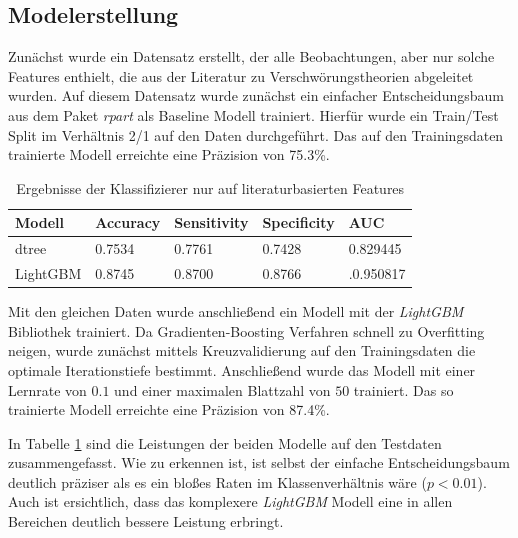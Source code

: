 \subsection{Modelerstellung}

Zunächst wurde ein Datensatz erstellt, der alle Beobachtungen, aber nur solche Features enthielt, die aus der Literatur zu Verschwörungstheorien abgeleitet wurden.
Auf diesem Datensatz wurde zunächst ein einfacher Entscheidungsbaum aus dem Paket \textit{rpart} \parencite[]{rpart} als Baseline Modell trainiert.
Hierfür wurde ein Train/Test Split im Verhältnis 2/1 auf den Daten durchgeführt.
Das auf den Trainingsdaten trainierte Modell erreichte eine Präzision von 75.3\%.


\begin{table}
    \begin{center}
        \begin{tabularx}{\textwidth}{X|XXXX}
            \toprule
            Modell & Accuracy & Sensitivity & Specificity & AUC\\
            \midrule
            dtree & 0.7534 & 0.7761 & 0.7428 & 0.829445 \\
            LightGBM & 0.8745 & 0.8700 & 0.8766 & .0.950817 \\
            \bottomrule
        \end{tabularx}
        \caption{Ergebnisse der Klassifizierer nur auf literaturbasierten Features}
        \label{small-model}
    \end{center}
\end{table}


Mit den gleichen Daten wurde anschließend ein Modell mit der \textit{LightGBM} Bibliothek \parencite[][]{lightgbm} trainiert.
Da Gradienten-Boosting Verfahren schnell zu Overfitting neigen, wurde zunächst mittels Kreuzvalidierung auf den Trainingsdaten die optimale Iterationstiefe bestimmt.
Anschließend wurde das Modell mit einer Lernrate von $0.1$ und einer maximalen Blattzahl von $50$ trainiert.
Das so trainierte Modell erreichte eine Präzision von 87.4\%.

In Tabelle \ref{small-model} sind die Leistungen der beiden Modelle auf den Testdaten zusammengefasst.
Wie zu erkennen ist, ist selbst der einfache Entscheidungsbaum deutlich präziser als es ein bloßes Raten im Klassenverhältnis wäre ($p < 0.01$).
Auch ist ersichtlich, dass das komplexere \textit{LightGBM} Modell eine in allen Bereichen deutlich bessere Leistung erbringt.

